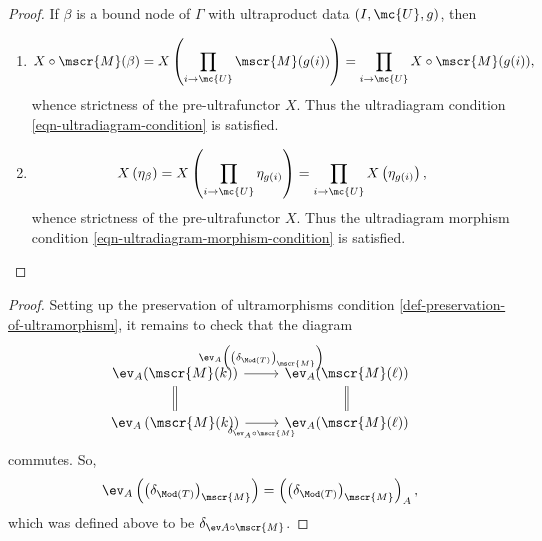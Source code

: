  \begin{proof}
        If $\beta$ is a bound node of $\Gamma$ with ultraproduct data $(I, \mc{U}, g)$, then
\begin{enumerate}\item
    $$
X \circ \mscr{M}(\beta) = X\left( \prod_{i \to \mc{U}} \mscr{M}(g(i))\right) = \prod_{i \to \mc{U}} X \circ \mscr{M}(g(i)),
$$
whence strictness of the pre-ultrafunctor $X$. Thus the ultradiagram condition \ref{eqn-ultradiagram-condition} is satisfied.
\item $$X \left(\eta_{\beta}\right) = X \left( \prod_{i \to \mc{U}} \eta_{g(i)} \right) = \prod_{i \to \mc{U}} X\left(\eta_{g(i)}\right),$$ whence strictness of the pre-ultrafunctor $X$. Thus the ultradiagram morphism condition \ref{eqn-ultradiagram-morphism-condition} is satisfied.
  \end{enumerate}
    \end{proof}
  


\begin{proof}
  Setting up the preservation of ultramorphisms condition \ref{def-preservation-of-ultramorphism}, it remains to check that the diagram
  $$
  \begin{tikzcd}[ampersand replacement = \&]
    \ev_A(\mscr{M}(k)) \arrow[equals]{d} \arrow{r}{\ev_A\left(\left(\delta_{\Mod(T)}\right)_{\mscr{M}} \right)} \& \ev_A(\mscr{M}(\ell)) \arrow[equals]{d}\\
\ev_A\left(\mscr{M}(k)\right)  \arrow[swap]{r}{\delta_{\ev_A \circ \mscr{M}}}\& \ev_A(\mscr{M}(\ell))
  \end{tikzcd}
  $$ commutes. So, $$\ev_A \left(  \left(\delta_{\Mod(T)}\right)_{\mscr{M}}\right) = \left(\left(\delta_{\Mod(T)}\right)_{\mscr{M}} \right)_{A},$$
  which was defined above to be $\delta_{\ev A \circ \mscr{M}}$.
\end{proof}

